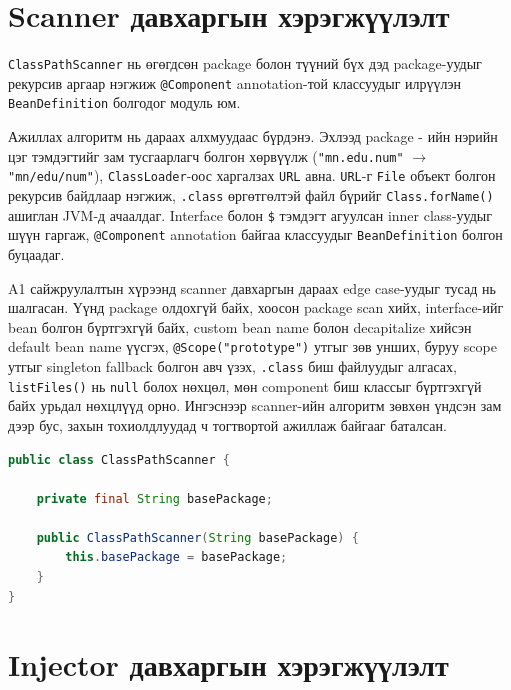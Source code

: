 \section{Scanner давхаргын хэрэгжүүлэлт}

\texttt{ClassPathScanner} нь өгөгдсөн package болон түүний бүх
дэд package-уудыг рекурсив аргаар нэгжиж \texttt{@Component}
annotation-той классуудыг илрүүлэн \texttt{BeanDefinition} болгодог
модуль юм.

Ажиллах алгоритм нь дараах алхмуудаас бүрдэнэ. Эхлээд package - ийн нэрийн
цэг тэмдэгтийг зам тусгаарлагч болгон хөрвүүлж
(\texttt{"mn.edu.num"} $\rightarrow$ \texttt{"mn/edu/num"}),
\texttt{ClassLoader}-оос харгалзах \texttt{URL} авна. \texttt{URL}-г
\texttt{File} объект болгон рекурсив байдлаар нэгжиж, \texttt{.class}
өргөтгөлтэй файл бүрийг \texttt{Class.forName()} ашиглан JVM-д
ачаалдаг. Interface болон \texttt{\$} тэмдэгт агуулсан inner class-уудыг
шүүн гаргаж, \texttt{@Component} annotation байгаа классуудыг
\texttt{BeanDefinition} болгон буцаадаг.

A1 сайжруулалтын хүрээнд scanner давхаргын дараах edge case-уудыг
тусад нь шалгасан. Үүнд package олдохгүй байх, хоосон package scan хийх,
interface-ийг bean болгон бүртгэхгүй байх, custom bean name болон
decapitalize хийсэн default bean name үүсгэх, \texttt{@Scope("prototype")}
утгыг зөв унших, буруу scope утгыг singleton fallback болгон авч үзэх,
\texttt{.class} биш файлуудыг алгасах, \texttt{listFiles()} нь
\texttt{null} болох нөхцөл, мөн component биш классыг бүртгэхгүй байх
урьдал нөхцлүүд орно. Ингэснээр scanner-ийн алгоритм зөвхөн үндсэн
зам дээр бус, захын тохиолдлуудад ч тогтвортой ажиллаж байгааг баталсан.

\begin{lstlisting}[language=Java,
    caption={\texttt{ClassPathScanner} классын хэрэгжүүлэлт},
    label={lst:classpathscanner}]
public class ClassPathScanner {

    private final String basePackage;

    public ClassPathScanner(String basePackage) {
        this.basePackage = basePackage;
    }
}
\end{lstlisting}

\section{Injector давхаргын хэрэгжүүлэлт}

